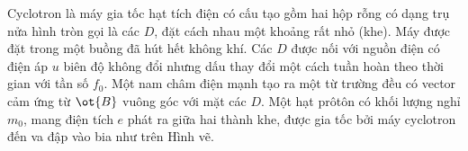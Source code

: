 \begin{vd}
Cyclotron là máy gia tốc hạt tích điện có cấu tạo gồm hai hộp rỗng có dạng trụ nửa hình tròn gọi là các $D$, đặt cách nhau một khoảng rất nhỏ (khe). Máy được đặt trong một buồng đã hút hết không khí. Các $D$ được nối với nguồn điện có điện áp $u$ biên độ không đổi nhưng dấu thay đổi một cách tuần hoàn theo thời gian với tần số $f_0$. Một nam châm điện mạnh tạo ra một từ trường đều có vector cảm ứng từ $\ot{B}$ vuông góc với mặt các $D$.
Một hạt prôtôn có khối lượng nghỉ $m_0$, mang điện tích $e$ phát ra giữa hai thành khe, được gia tốc bởi máy cyclotron đến va đập vào bia như trên Hình vẽ.
\begin{center}
    


\begin{tikzpicture}[x=0.75pt,y=0.75pt,yscale=-1,xscale=1]


\end{tikzpicture}
\end{center}
\end{vd}
